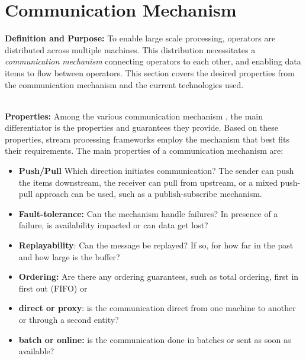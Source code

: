 \section{Communication Mechanism}
\label{sec:communication}


\noindent\textbf{Definition and Purpose:} To enable large scale processing, operators are distributed across multiple machines. This distribution necessitates a \textit{communication mechanism} connecting operators to each other, and enabling data items to flow between operators. This section covers the desired properties from the communication mechanism and the current technologies used.



\noindent \textbf{\\Properties:}
%
Among the various communication mechanism , the main differentiator is the properties and guarantees they provide. 
Based on these properties, stream processing frameworks employ the mechanism that best fits their requirements. The main properties of a communication mechanism are:

\begin{itemize}
	
	
	\item \textbf{Push/Pull} Which direction initiates communication? The sender can push the items downstream, the receiver can pull from upstream, or a mixed push-pull approach can be used, such as a publish-subscribe mechanism. 
	
	
	\item \textbf{Fault-tolerance:} Can the mechanism handle failures? In presence of a failure, is availability impacted or can data get lost?  
	\item \textbf{Replayability}: Can the message be replayed? If so, for how far in the past and how large is the buffer?
	
	\item \textbf{Ordering:} Are there any ordering guarantees, such as total ordering,  first in first out (FIFO) or 
	
	\item \textbf{ direct or proxy}: is the communication direct from one machine to another or through a second entity?
	\item \textbf{ batch or online: } is the communication done in batches or sent as soon as available?
\end{itemize}

